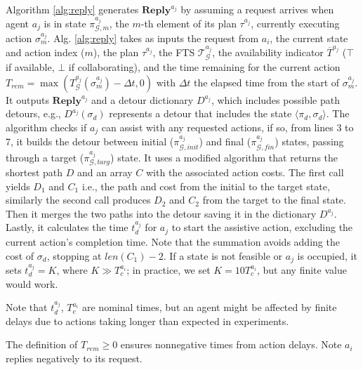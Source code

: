 Algorithm \ref{alg:reply} generates $\mathbf{Reply}^{a_j}$ by assuming a request arrives when agent $a_j$ is in state $\pi^{a_j}_{\mathcal{G}, m}$, the $m$-th element of its plan $\tau^{a_j}$, currently executing action $\sigma^{a_j}_m$. Alg. \ref{alg:reply} takes as inputs the request from $a_i$, the current state and action index ($m$), the plan $\tau^{a_j}$, the FTS $\mathcal{T}_{\mathcal{G}}^{a_j}$, the availability indicator $\overline{T}^{a_j}$ ($\top$ if available, $\bot$ if collaborating), and the time remaining for the current action $T_{rem} = \max(T^{a_j}_{\mathcal{G}}(\sigma^{a_j}_m) - \Delta t, 0)$ with $\Delta t$ the elapsed time from the start of $\sigma^{a_j}_m$. It outputs $\mathbf{Reply}^{a_j}$ and a detour dictionary $D^{a_j}$, which includes possible path detours, e.g., $D^{a_j}(\sigma_d)$ represents a detour that includes the state $\langle\pi_d, \sigma_d\rangle$. The algorithm checks if $a_j$ can assist with any requested actions, if so, from lines 3 to 7, it builds the detour between initial ($\pi^{a_j}_{\mathcal{G}, init}$) and final ($\pi^{a_j}_{\mathcal{G}, fin}$) states, passing through a target ($\pi^{a_j}_{\mathcal{G}, targ}$) state. It uses a modified \Dijkstra algorithm that returns the shortest path $D$ and an array $C$ with the associated action costs. The first call yields $D_1$ and $C_1$ i.e., the path and cost from the initial to the target state, similarly the second call produces $D_2$ and $C_2$ from the target to the final state. Then it merges the two paths into the detour saving it in the dictionary $D^{a_j}$. Lastly, it calculates the time $t^{a_j}_{d}$ for $a_j$ to start the assistive action, excluding the current action's completion time. Note that the summation avoids adding the cost of $\sigma_d$, stopping at $len(C_1)-2$. If a state is not feasible or $a_j$ is occupied, it sets $t^{a_j}_d = K$, where $K \gg T^{a_i}_c$; in practice, we set $K=10 T^{a_i}_c$, but any finite value would work. 
\begin{remark} \label{rem:delays}
    Note that $t^{a_j}_d$, $T^{a_i}_c$ are nominal times, but an agent might be affected by finite delays due to actions taking longer than expected in experiments.
\end{remark}
The definition of $T_{rem} \geq 0$ ensures nonnegative times from action delays. Note $a_i$ replies negatively to its request.
